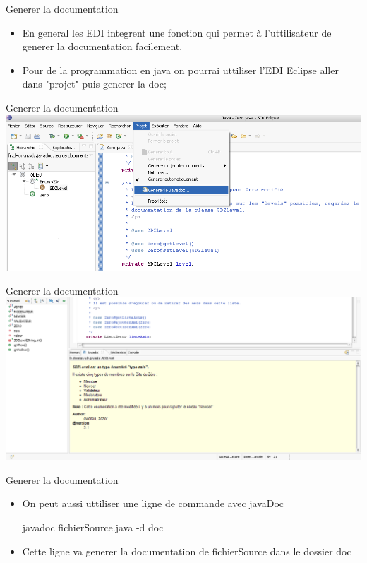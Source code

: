 \documentclass{beamer}
\begin{document}
\begin{frame}{Generer la documentation}
 \begin{itemize}
    \item {
En general les EDI integrent une fonction qui permet à l'uttilisateur de generer la documentation facilement.
}
    \item {
Pour de la programmation en java on pourrai uttiliser l'EDI Eclipse
aller dans "projet" puis generer la doc;
}
  \end{itemize}
\end{frame}

\begin{frame}{Generer la documentation}
 \includegraphics[scale=0.45]{Images/gendoc.png}
\end{frame}


\begin{frame}{Generer la documentation}
 \includegraphics[scale=0.32]{Images/gendoc2.png}
\end{frame}

\begin{frame}{Generer la documentation}
\begin{itemize}
\item {
    On peut aussi uttiliser une ligne de commande avec javaDoc\\
}
\begin{example}
     javadoc  fichierSource.java -d doc
\end{example}
\item{
    Cette ligne va generer la documentation de fichierSource dans le dossier doc
}
\end{itemize}
\end{frame}
\end{document}

